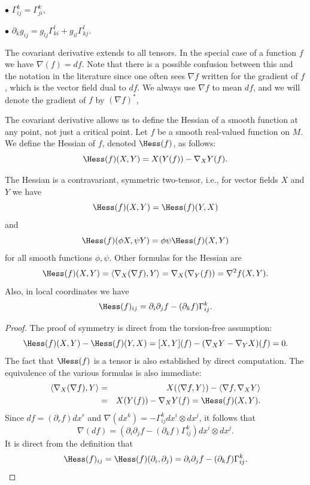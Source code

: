 \smallskip

$\bullet$ $\Gamma^k_{ij}=\Gamma^k_{ji}$,

$\bullet$ $\partial_k g_{ij}=g_{l j}\Gamma^l_{ki}+g_{il
}\Gamma^l_{kj}$.

The covariant derivative extends to all tensors. In the special case
of a function $f$ we have $\nabla( f)=df$. Note that there is a
possible confusion between this and  the notation in the literature
since one often sees $\nabla f$ written for the gradient of $f$,
which is the vector field dual to $df$. We always use $\nabla f$ to
mean $df$, and we will denote the gradient of $f$ by $(\nabla f)^*$,

The covariant derivative allows us to define the Hessian of a smooth
function at any point, not just a critical point. Let $f$ be a
smooth real-valued function on $M$.  We define the
Hessian  of $f$, denoted $\Hess(f)$, as
follows:
\begin{equation}\label{Hessian}
\Hess(f)(X,Y)=X(Y(f))-\nabla_XY(f).\end{equation}
\begin{lemma}
\label{lem:hessian-symmetric}
\label{Hessformula}
\leanok
 The Hessian is a contravariant, symmetric two-tensor, i.e., for
 vector fields $X$ and $Y$ we have
$$\Hess(f)(X,Y)=\Hess(f)(Y,X)$$
and
$$\Hess(f)(\phi X,\psi Y)=\phi\psi \Hess(f)(X,Y)$$
for all smooth functions $\phi,\psi$. Other formulas for the Hessian
are
$$\Hess(f)(X,Y)=\langle \nabla_X(\nabla f),Y\rangle=\nabla_X(\nabla_Y(f))=\nabla^2f(X,Y).$$
Also, in local coordinates  we have
$$\Hess(f)_{ij}=\partial_i\partial_jf-(\partial_kf)\Gamma^k_{ij}.$$
\end{lemma}

\begin{proof}
\leanok
{}
The proof of symmetry is direct from the torsion-free assumption:
$$\Hess(f)(X,Y)-\Hess(f)(Y,X)=[X,Y](f)-(\nabla_XY-\nabla_YX)(f)=0.$$
 The fact that
$\Hess(f)$ is a tensor is also established by direct
computation. The equivalence of the various formulas is also
immediate:
\begin{eqnarray}\label{hessform}
\langle\nabla_X(\nabla f),Y\rangle & = & X(\langle \nabla
f,Y\rangle)-\langle\nabla f,\nabla_XY\rangle
\\ & = & X(Y(f))-\nabla_XY(f)=\Hess(f)(X,Y).\nonumber
\end{eqnarray}
Since $df=(\partial_rf) dx^r$ and
$\nabla(dx^k)=-\Gamma_{ij}^kdx^i\otimes dx^j$, it follows that
$$\nabla(df)=\left(\partial_i\partial_jf-(\partial_kf)\Gamma^k_{ij}\right)dx^i\otimes
dx^j.$$ It is direct from the definition that
$$\Hess(f)_{ij}=\Hess(f)(\partial_i,\partial_j)=\partial_i\partial_jf-(\partial_kf)\Gamma_{ij}^k.$$
\end{proof}


